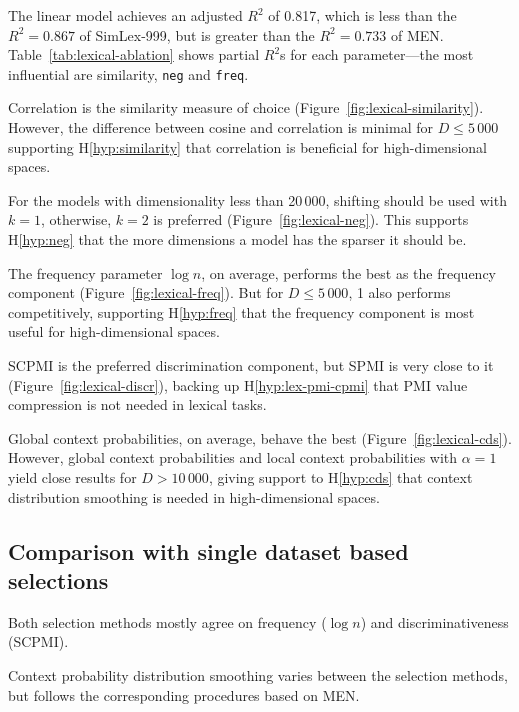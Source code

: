 The linear model achieves an adjusted $R^2$ of 0.817, which is less than the $R^2 = 0.867$ of SimLex-999, but is greater than the $R^2 = 0.733$ of MEN. Table~\ref{tab:lexical-ablation} shows partial $R^2$s for each parameter---the most influential are similarity, \texttt{neg} and \texttt{freq}.


Correlation is the similarity measure of choice (Figure~\ref{fig:lexical-similarity}). However, the difference between cosine and correlation is minimal for $D \leq 5\,000$ supporting H\ref{hyp:similarity} that correlation is beneficial for high-dimensional spaces.



For the models with dimensionality less than 20\,000, shifting should be used with $k = 1$, otherwise, $k = 2$ is preferred (Figure~\ref{fig:lexical-neg}). This supports H\ref{hyp:neg} that the more dimensions a model has the sparser it should be.


The frequency parameter $\log n$, on average, performs the best as the frequency component (Figure~\ref{fig:lexical-freq}). But for $D \leq 5\,000$, 1 also performs competitively, supporting H\ref{hyp:freq} that the frequency component is most useful for high-dimensional spaces.

SCPMI is the preferred discrimination component, but SPMI is very close to it (Figure~\ref{fig:lexical-discr}), backing up H\ref{hyp:lex-pmi-cpmi} that PMI value compression is not needed in lexical tasks.


Global context probabilities, on average, behave the best (Figure~\ref{fig:lexical-cds}). However, global context probabilities and local context probabilities with $\alpha = 1$ yield close results for $D > 10\,000$, giving support to H\ref{hyp:cds} that context distribution smoothing is needed in high-dimensional spaces.

\subsection{Comparison with single dataset based selections}

Both selection methods mostly agree on frequency ($\log n$) and discriminativeness (SCPMI).

Context probability distribution smoothing varies between the selection methods, but follows the corresponding procedures based on MEN.

